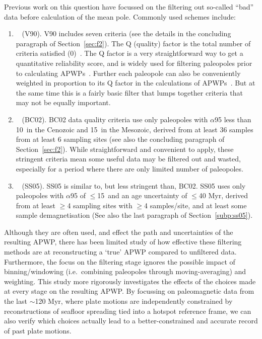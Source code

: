 Previous work on this question have focussed on the filtering out so-called
``bad'' data before calculation of the mean pole. Commonly used schemes include:
\begin{enumerate}
  \item~\citet{v90} (V90). V90 includes seven criteria (see the details in the
    concluding paragraph of Section~\ref{sec:f2}). The Q (quality) factor is the
    total number of criteria satisfied (0)~\citep{v88}. The Q factor
    is a very straightforward way to get a quantitative reliability score, and
    is widely used for filtering paleopoles prior to calculating
    APWPs~\citep[e.g.][]{T12,Ma16,F19}. Further each paleopole can also be
    conveniently weighted in proportion to its Q factor in the calculations of
    APWPs~\citep{T92}. But at the same time this is a fairly basic filter that
    lumps together criteria that may not be equally important.
  \item~\citet{B02} (BC02). BC02 data quality criteria use only paleopoles with
    $\alpha$95 less than 10\degree\ in the Cenozoic and 15\degree\ in the
    Mesozoic, derived from at least 36 samples from at least 6 sampling sites
    (see also the concluding paragraph of Section~\ref{sec:f2}). While
    straightforward and convenient to apply, these stringent criteria mean some
    useful data may be filtered out and wasted, especially for a period where
    there are only limited number of paleopoles.
  \item~\citet{S05} (SS05). SS05 is similar to, but less stringent than, BC02.
    SS05 uses only paleopoles with $\alpha$95 of $\leq$15\degree\ and an age
    uncertainty of $\leq$40 Myr, derived from at least $\geq$4 sampling sites
    with $\geq$4 samples/site, and at least some sample demagnetisation (See
    also the last paragraph of Section~\ref{subp:ss05}).
\end{enumerate}

Although they are often used, and effect the path and uncertainties of the
resulting APWP, there has been limited study of how effective these filtering
methods are at reconstructing a `true' APWP compared to unfiltered data.
Furthermore, the focus on the filtering stage ignores the possible impact of
binning/windowing (i.e.\ combining paleopoles through moving-averaging) and
weighting. This study more rigorously investigates the effects of the choices
made at every stage on the resulting APWP\@. By focussing on paleomagnetic data
from the last $\sim$120 Myr, where plate motions are independently constrained
by reconstructions of seafloor spreading tied into a hotspot reference frame, we
can also verify which choices actually lead to a better-constrained and accurate
record of past plate motions.


